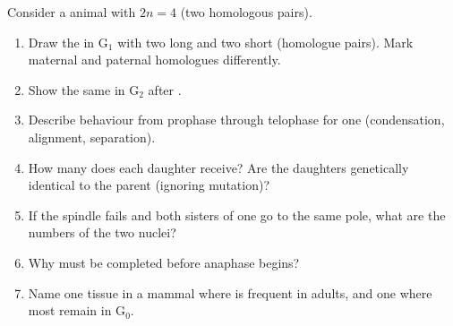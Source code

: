\begin{problem}\label{pb:g11:cell-cycle-mitosis:1}
Consider a  animal  with $2n = 4$  (two homologous pairs).
\begin{enumerate}
  \item Draw the  in G$_1$ with two long and two short  (homologue
        pairs). Mark maternal and paternal homologues differently.
  \item Show the same  in G$_2$ after .
  \item Describe  behaviour from prophase through telophase for one
         (condensation, alignment, separation).
  \item How many  does each daughter  receive? Are the daughters
        genetically identical to the parent (ignoring mutation)?
  \item If the spindle  fails and both sisters of one  go to
        the same pole, what are the  numbers of the two nuclei?
  \item Why must  be completed before anaphase begins?
  \item Name one tissue in a mammal where  is frequent in adults, and one
        where most  remain in G$_0$.
\end{enumerate}
\end{problem}
